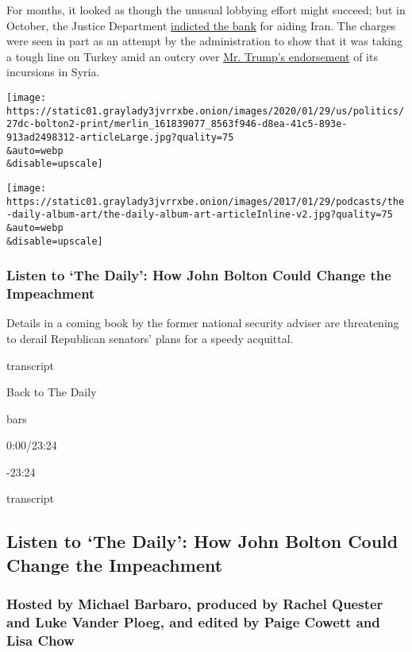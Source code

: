 For months, it looked as though the unusual lobbying effort might
succeed; but in October, the Justice Department
\href{https://www.nytimes3xbfgragh.onion/2019/10/15/us/politics/halkbank-turkey-iran-indictment.html}{indicted
the bank} for aiding Iran. The charges were seen in part as an attempt
by the administration to show that it was taking a tough line on Turkey
amid an outcry over
\href{https://www.nytimes3xbfgragh.onion/2019/10/07/us/politics/turkey-syria-trump.html}{Mr.
Trump's endorsement} of its incursions in Syria.

\texttt{[image: https://static01.graylady3jvrrxbe.onion/images/2020/01/29/us/politics/27dc-bolton2-print/merlin\_161839077\_8563f946-d8ea-41c5-893e-913ad2498312-articleLarge.jpg?quality=75\\\&auto=webp\\\&disable=upscale]}

\texttt{[image: https://static01.graylady3jvrrxbe.onion/images/2017/01/29/podcasts/the-daily-album-art/the-daily-album-art-articleInline-v2.jpg?quality=75\\\&auto=webp\\\&disable=upscale]}

\hypertarget{listen-to-the-daily-how-john-bolton-could-change-the-impeachment}{%
\subsubsection{Listen to `The Daily': How John Bolton Could Change the
Impeachment}\label{listen-to-the-daily-how-john-bolton-could-change-the-impeachment}}

Details in a coming book by the former national security adviser are
threatening to derail Republican senators' plans for a speedy acquittal.

transcript

Back to The Daily

bars

0:00/23:24

-23:24

transcript

\hypertarget{listen-to-the-daily-how-john-bolton-could-change-the-impeachment-1}{%
\subsection{Listen to `The Daily': How John Bolton Could Change the
Impeachment}\label{listen-to-the-daily-how-john-bolton-could-change-the-impeachment-1}}

\hypertarget{hosted-by-michael-barbaro-produced-by-rachel-quester-and-luke-vander-ploeg-and-edited-by-paige-cowett-and-lisa-chow}{%
\subsubsection{Hosted by Michael Barbaro, produced by Rachel Quester and
Luke Vander Ploeg, and edited by Paige Cowett and Lisa
Chow}\label{hosted-by-michael-barbaro-produced-by-rachel-quester-and-luke-vander-ploeg-and-edited-by-paige-cowett-and-lisa-chow}}

